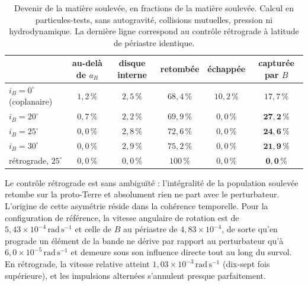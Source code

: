 \documentclass[11pt,a4paper]{article}
\begin{document}
\begin{table}[h!]
\centering
\caption{Devenir de la matière soulevée, en fractions de la matière soulevée. Calcul en particules-tests, sans autogravité, collisions mutuelles, pression ni hydrodynamique. La dernière ligne correspond au contrôle rétrograde à latitude de périastre identique.}
\vspace{0.5em}
\label{tab:fate}
\setlength{\tabcolsep}{5pt}
\begin{tabular}{lccccc}
\toprule
 & au-delà de $a_R$ & disque interne & retombée & échappée & capturée par $B$ \\
\midrule
$i_B = 0^\circ$ (coplanaire) & $1{,}2\,\%$ & $2{,}5\,\%$ & $68{,}4\,\%$ & $10{,}2\,\%$ & $17{,}7\,\%$ \\
$i_B = 20^\circ$            & $0{,}7\,\%$ & $2{,}2\,\%$ & $69{,}9\,\%$ & $0{,}0\,\%$  & $\mathbf{27{,}2\,\%}$ \\
$i_B = 25^\circ$            & $0{,}0\,\%$ & $2{,}8\,\%$ & $72{,}6\,\%$ & $0{,}0\,\%$  & $\mathbf{24{,}6\,\%}$ \\
$i_B = 30^\circ$            & $0{,}0\,\%$ & $2{,}9\,\%$ & $75{,}2\,\%$ & $0{,}0\,\%$  & $\mathbf{21{,}9\,\%}$ \\
\midrule
rétrograde, $25^\circ$      & $0{,}0\,\%$ & $0{,}0\,\%$ & $100\,\%$  & $0{,}0\,\%$  & $\mathbf{0{,}0\,\%}$ \\
\bottomrule
\end{tabular}
\end{table}

Le contrôle rétrograde est sans ambiguïté : l'intégralité de la population soulevée retombe sur la proto-Terre et absolument rien ne part avec le perturbateur. L'origine de cette asymétrie réside dans la cohérence temporelle. Pour la configuration de référence, la vitesse angulaire de rotation est de $5{,}43 \times 10^{-4}\,\mathrm{rad\,s^{-1}}$ et celle de $B$ au périastre de $4{,}83 \times 10^{-4}$, de sorte qu'en prograde un élément de la bande ne dérive par rapport au perturbateur qu'à $6{,}0 \times 10^{-5}\,\mathrm{rad\,s^{-1}}$ et demeure sous son influence directe tout au long du survol. En rétrograde, la vitesse relative atteint $1{,}03 \times 10^{-3}\,\mathrm{rad\,s^{-1}}$ (dix-sept fois supérieure), et les impulsions alternées s'annulent presque parfaitement.
\end{document}
